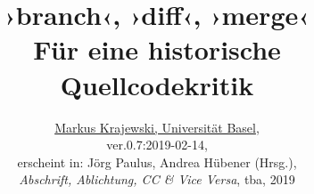 \documentclass[a4paper,12pt]{article}
\date{}
\newcommand{\inanf}[1]{›#1‹}
\begin{document}
%
% 
\title{\inanf{branch}, \inanf{diff}, \inanf{merge}\\
\large Für eine historische Quellcodekritik}
\author{\href{http://gtm.mewi.unibas.ch}{Markus Krajewski, Universität Basel},\\[-1mm]
ver.0.7:2019-02-14, \gitVer{}\\
erscheint in: Jörg Paulus, Andrea Hübener (Hrsg.),\\
\emph{Abschrift, Ablichtung, CC \& Vice Versa}, tba, 2019}
\maketitle
\tableofcontents
\newpage
%
\begin{comment}

6 Abbildungen

Alternativ-Version für Konstanz:

"Assistenzsysteme. Mimetische Praktiken kollektiver Autorschaft zwischen Mensch und Maschine"

Neuer Einstieg: Was sind Assistenzsysteme? Sie überwachen. Hier: die Unterschiede, und zwar die Unterschiede in den Texten.

Welche historischen Vergleiche? Die Korrektoren.

Darüber die Brücke zur Auto(r)Korrektur. Hier die Notwendigkeit, mimetischer Praktiken ins Spiel bringen...

\end{comment}

\noindent 
\end{document}

